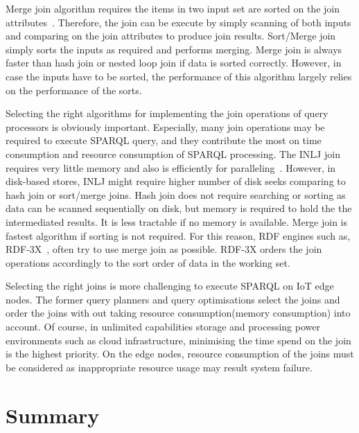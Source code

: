 {Merge join algorithm requires the items in two input set are sorted on the join attributes~\citep{Ullman:2001}.
Therefore, the join can be execute by simply scanning of both inputs and comparing on the join attributes to produce join results. 
Sort/Merge join simply sorts the inputs as required and performs merging.
Merge join is always faster than hash join or nested loop join if data is sorted correctly.
However, in case the inputs have to be sorted, the performance of this algorithm largely relies on the performance of the sorts.

Selecting the right algorithms for implementing the join operations of query processors is obviously important.
Especially, many join operations may be required to execute SPARQL query, and they contribute the most on time consumption and resource consumption of SPARQL processing. 
The INLJ join requires very little memory and also is efficiently for paralleling~\citep{Sheu:1991}.
However, in disk-based stores, INLJ might require higher number of disk seeks comparing to hash join or sort/merge joins.
Hash join does not require searching or sorting as data can be scanned sequentially on disk, but memory is required to hold the the intermediated results.
It is less tractable if no memory is available.
Merge join is fastest algorithm if sorting is not required. 
For this reason, RDF engines such as, RDF-3X~\citep{Neumann:2010}, often try to use merge join as possible. 
RDF-3X orders the join operations accordingly to the sort order of data in the working set.

Selecting the right joins is more challenging to execute SPARQL on IoT edge nodes.
The former query planners and query optimisations select the joins and order the joins with out taking resource consumption(memory consumption) into account. 
Of course, in unlimited capabilities storage and processing power environments such as cloud infrastructure, minimising the time spend on the join is the highest priority. 
On the edge nodes, resource consumption of the joins must be considered as inappropriate resource usage may result system failure.

\section{Summary}

}
